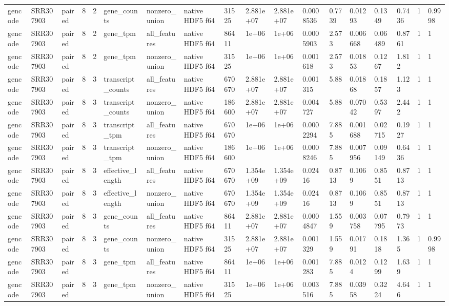 \begin{tabular}{llllllllllllllllll}
gencode & SRR307903 & paired & 8 & 2 & gene\_counts & nonzero\_union & native HDF5 f64 & 31525 & 2.881e+07 & 2.881e+07 & 0.0008536 & 0.7739 & 0.01293 & 0.1349 & 0.7436 & 1 & 0.9998 \\
gencode & SRR307903 & paired & 8 & 2 & gene\_tpm & all\_features & native HDF5 f64 & 86411 & 1e+06 & 1e+06 & 0.0005903 & 2.573 & 0.006668 & 0.06489 & 0.8761 & 1 & 1 \\
gencode & SRR307903 & paired & 8 & 2 & gene\_tpm & nonzero\_union & native HDF5 f64 & 31525 & 1e+06 & 1e+06 & 0.001618 & 2.573 & 0.01853 & 0.1267 & 1.812 & 1 & 1 \\
gencode & SRR307903 & paired & 8 & 3 & transcript\_counts & all\_features & native HDF5 f64 & 670670 & 2.881e+07 & 2.881e+07 & 0.001315 & 5.88 & 0.01868 & 0.1857 & 1.123 & 1 & 1 \\
gencode & SRR307903 & paired & 8 & 3 & transcript\_counts & nonzero\_union & native HDF5 f64 & 186600 & 2.881e+07 & 2.881e+07 & 0.004727 & 5.88 & 0.07042 & 0.5397 & 2.442 & 1 & 1 \\
gencode & SRR307903 & paired & 8 & 3 & transcript\_tpm & all\_features & native HDF5 f64 & 670670 & 1e+06 & 1e+06 & 0.0002294 & 7.885 & 0.001688 & 0.02715 & 0.1927 & 1 & 1 \\
gencode & SRR307903 & paired & 8 & 3 & transcript\_tpm & nonzero\_union & native HDF5 f64 & 186600 & 1e+06 & 1e+06 & 0.0008246 & 7.885 & 0.007956 & 0.09149 & 0.6436 & 1 & 1 \\
gencode & SRR307903 & paired & 8 & 3 & effective\_length & all\_features & native HDF5 f64 & 670670 & 1.354e+09 & 1.354e+09 & 0.02416 & 0.8713 & 0.1069 & 0.8551 & 0.8713 & 1 & 1 \\
gencode & SRR307903 & paired & 8 & 3 & effective\_length & nonzero\_union & native HDF5 f64 & 670670 & 1.354e+09 & 1.354e+09 & 0.02416 & 0.8713 & 0.1069 & 0.8551 & 0.8713 & 1 & 1 \\
gencode & SRR307903 & paired & 8 & 3 & gene\_counts & all\_features & native HDF5 f64 & 86411 & 2.881e+07 & 2.881e+07 & 0.0004847 & 1.559 & 0.003758 & 0.07795 & 0.7973 & 1 & 1 \\
gencode & SRR307903 & paired & 8 & 3 & gene\_counts & nonzero\_union & native HDF5 f64 & 31525 & 2.881e+07 & 2.881e+07 & 0.001329 & 1.559 & 0.01791 & 0.1818 & 1.365 & 1 & 0.9998 \\
gencode & SRR307903 & paired & 8 & 3 & gene\_tpm & all\_features & native HDF5 f64 & 86411 & 1e+06 & 1e+06 & 0.001283 & 7.885 & 0.0124 & 0.1299 & 1.639 & 1 & 1 \\
gencode & SRR307903 & paired & 8 & 3 & gene\_tpm & nonzero\_union & native HDF5 f64 & 31525 & 1e+06 & 1e+06 & 0.003516 & 7.885 & 0.03958 & 0.3224 & 4.646 & 1 & 1 \\

\end{tabular}
